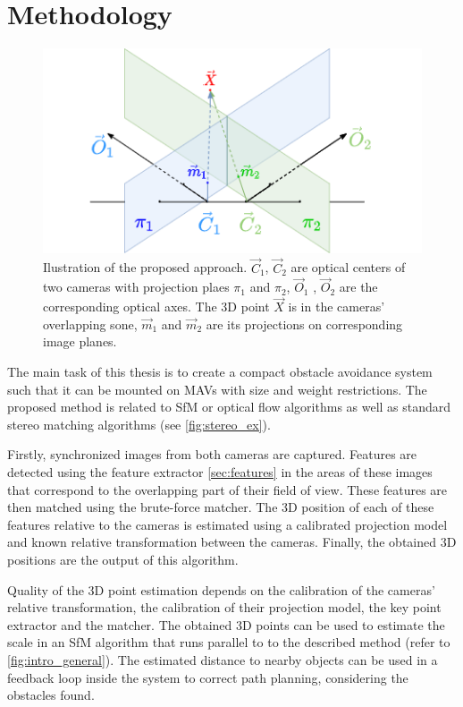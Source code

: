 \chapter{Methodology}

\label{chapter:methodology}

\begin{figure}[h]
    \centering
    \includegraphics[width=.8\textwidth]{graphics/td90deg.png}
    \caption[The proposed approach model.]{Ilustration of the proposed approach. $\vec{C}_1$, $\vec{C}_2$ are optical centers of two cameras with projection plaes $\pi_1$ and $\pi_2$, $\vec{O}_1$ , $\vec{O}_2$ are the corresponding optical axes. The 3D point $\vec{X}$ is in the cameras' overlapping sone, $\vec{m}_1$ and $\vec{m}_2$ are its projections on corresponding image planes.}
    \label{fig:td90deg}
\end{figure}

The main task of this thesis is to create a compact obstacle avoidance system such that it can be mounted on MAVs with size and weight restrictions.
The proposed method is related to SfM or optical flow algorithms as well as standard stereo matching algorithms (see \autoref{fig:stereo_ex}).

Firstly, synchronized images from both cameras are captured. Features are detected using the feature extractor \autoref{sec:features} in the areas of these images that correspond to the overlapping part of their field of view. 
These features are then matched using the brute-force matcher.
The 3D position of each of these features relative to the cameras is estimated using a calibrated projection model and known relative transformation between the cameras.
Finally, the obtained 3D positions are the output of this algorithm. 

Quality of the 3D point estimation depends on the calibration of the cameras' relative transformation, the calibration of their projection model, the key point extractor and the matcher.
The obtained 3D points can be used to estimate the scale in an SfM algorithm that runs parallel to to the described method (refer to  \autoref{fig:intro_general}).
The estimated distance to nearby objects can be used in a feedback loop inside the system to correct path planning, considering the obstacles found.

